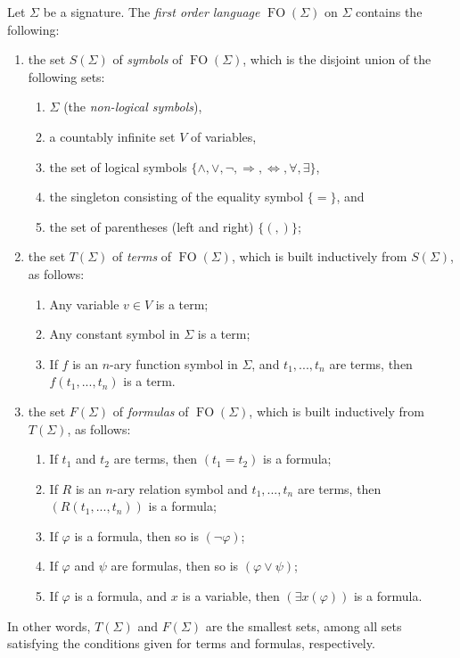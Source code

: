 \documentclass[12pt]{article}
\newcommand{\Or}{\vee}
\newcommand{\Implies}{\Rightarrow}
\newcommand{\Iff}{\Leftrightarrow}
\renewcommand{\And}{\wedge}
\begin{document}
Let $\Sigma$ be a signature.  The \emph{first order language} $\operatorname{FO}(\Sigma)$ on $\Sigma$ contains the following:
\begin{enumerate}
\item the set $S(\Sigma)$ of \emph{symbols} of $\operatorname{FO}(\Sigma)$, which is the disjoint union of the following sets:
\begin{enumerate}
\item $\Sigma$ (the \emph{non-logical symbols}), 
\item a countably infinite set $V$ of variables, 
\item the set of logical symbols $\lbrace \And, \Or, \neg, \Implies, \Iff, \forall, \exists \rbrace$, 
\item the singleton consisting of the equality symbol $\lbrace =\rbrace$, and 
\item the set of parentheses (left and right) $\lbrace (, )\rbrace$;
\end{enumerate}
\item the set $T(\Sigma)$ of \emph{terms} of $\operatorname{FO}(\Sigma)$, which is built inductively from $S(\Sigma)$, as follows: 
\begin{enumerate}
\item Any variable $v\in V$ is a term;
\item Any constant symbol in $\Sigma$ is a term;
\item If $f$ is an $n$-ary function symbol in $\Sigma$, and $t_1,...,t_n$ are
terms, then $f(t_1,...,t_n)$ is a term.
\end{enumerate}
\item the set $F(\Sigma)$ of \emph{formulas} of $\operatorname{FO}(\Sigma)$, which is built inductively from $T(\Sigma)$, as follows:
\begin{enumerate}
\item If $t_1$ and $t_2$ are terms, then $(t_1=t_2)$ is a formula;
\item If $R$ is an $n$-ary relation symbol and $t_1,...,t_n$ are
terms, then $(R(t_1,...,t_n))$ is a formula;
\item If $\varphi$ is a formula, then so is $(\neg\varphi)$;
\item If $\varphi$ and $\psi$ are formulas, then so is $(\varphi\Or\psi)$;
\item If $\varphi$ is a formula, and $x$ is a variable, then $(\exists x(\varphi))$ is a formula.
\end{enumerate}
\end{enumerate}
In other words, $T(\Sigma)$ and $F(\Sigma)$ are the smallest sets, among all sets satisfying the conditions given for terms and formulas, respectively.
\end{document}
